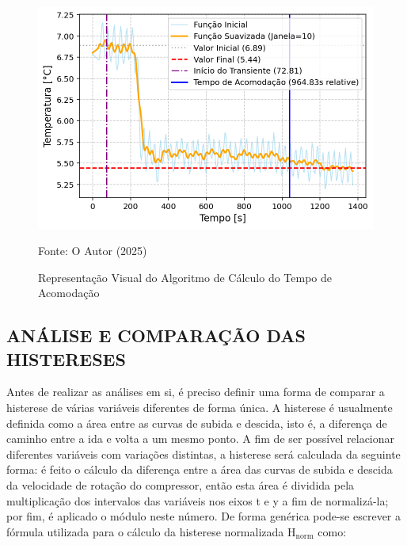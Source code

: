 \begin{figure}[h]
    \centering
    \includegraphics[width=1\linewidth]{FigurasdoTexto/Exemplo tempo de acomodação.png}
    \caption{Representação Visual do Algoritmo de Cálculo do Tempo de Acomodação}
    \label{fig:exemplo de cálculo do tempo de acomodação}
    {\footnotesize Fonte: O Autor (2025)}
\end{figure}
\subsection{\MakeUppercase{Análise e Comparação das Histereses}} \label{subsec:Método de Análise da Histerese}

Antes de realizar as análises em si, é preciso definir uma forma de comparar a histerese de várias variáveis diferentes de forma única. A histerese é usualmente definida como a área entre as curvas de subida e descida, isto é, a diferença de caminho entre a ida e volta a um mesmo ponto. A fim de ser possível relacionar diferentes variáveis com variações distintas, a histerese será calculada da seguinte forma: é feito o cálculo da diferença entre a área das curvas de subida e descida da velocidade de rotação do compressor, então esta área é dividida pela multiplicação dos intervalos das variáveis nos eixos t e y a fim de normalizá-la; por fim, é aplicado o módulo neste número. De forma genérica pode-se escrever a fórmula utilizada para o cálculo da histerese normalizada $\text{H}_\text{norm}$ como:

